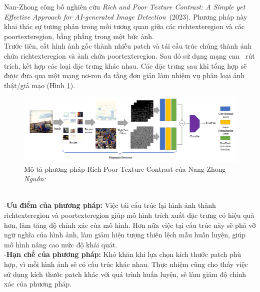 Nan-Zhong công bố nghiên cứu \textit{Rich and Poor Texture Contrast: A Simple yet Effective Approach for AI-generated Image Detection}~\cite{zhong2023rich}(2023). Phương pháp này khai thác sự tương phản trong mối tương quan giữa các \gls{richtexteregion} và các \gls{poortexteregion}, bằng phẳng trong một bức ảnh. \\
%
Trước tiên, cắt hình ảnh gốc thành nhiều \gls{patch} và tái cấu trúc chúng thành ảnh chứa \gls{richtexteregion} và ảnh chứa \gls{poortexteregion}. Sau đó sử dụng mạng \gls{cnn}~\cite{Krizhevsky2012ImageNetCW} rút trích, kết hợp các loại đặc trưng khác nhau. Các đặc trưng sau khi tổng hợp sẽ được đưa qua một mạng nơ-ron đa tầng đơn giản làm nhiệm vụ phân loại ảnh thật/giả mạo (Hình \ref{fig:model-rich-poor-textture-1}).
%
\begin{figure}[h]
	\centering
	\includegraphics[width=1.0\linewidth]{Images/model-rich-poor-textture-1.png}
	\begin{minipage}{0.9\linewidth}
		\caption{Mô tả phương pháp Rich Poor Texture Contrast của Nang-Zhong \textit{Nguồn: \cite{zhong2023rich}}}
		\label{fig:model-rich-poor-textture-1}
	\end{minipage}
\end{figure}\\
%
-\textbf{Ưu điểm của phương pháp:}
Việc tái cấu trúc lại hình ảnh thành \gls{richtexteregion} và \gls{poortexteregion} giúp mô hình trích xuất đặc trưng có hiệu quả hơn, làm tăng độ chính xác của mô hình. Hơn nữa việc tại cấu trúc này sẽ phá vỡ ngữ nghĩa của hình ảnh, làm giảm hiện tượng thiên lệch mẫu huấn luyện, giúp mô hình nâng cao mức độ khái quát.\\
-\textbf{Hạn chế của phương pháp:}
Khó khăn khi lựa chọn kích thước \gls{patch} phù hợp, vì mỗi hình ảnh sẽ có cấu trúc khác nhau. Thực nhiệm cũng cho thấy việc sử dụng kích thước \gls{patch} khác với quá trình huấn luyện, sẽ làm giảm độ chính xác của phương pháp.
%
